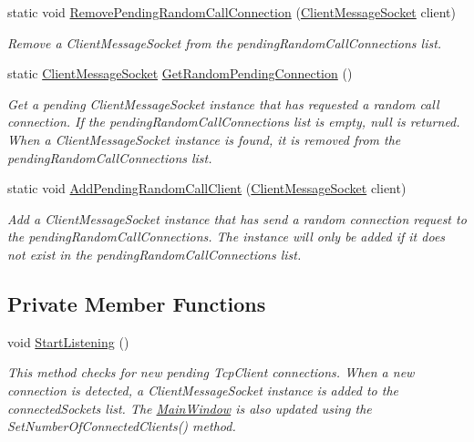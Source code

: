 \begin{DoxyCompactItemize}
static void \hyperlink{class_e_l_i_server_1_1_message_socket_manager_aa4716112d551ce249f56cca53764d19d}{Remove\+Pending\+Random\+Call\+Connection} (\hyperlink{class_e_l_i_server_1_1_messaging_1_1_client_message_socket}{Client\+Message\+Socket} client)
\begin{DoxyCompactList}\small\item\em Remove a Client\+Message\+Socket from the pending\+Random\+Call\+Connections list. \end{DoxyCompactList}\item 
static \hyperlink{class_e_l_i_server_1_1_messaging_1_1_client_message_socket}{Client\+Message\+Socket} \hyperlink{class_e_l_i_server_1_1_message_socket_manager_a6988d1ee0c08ded66a3d428f04585716}{Get\+Random\+Pending\+Connection} ()
\begin{DoxyCompactList}\small\item\em Get a pending Client\+Message\+Socket instance that has requested a random call connection. If the pending\+Random\+Call\+Connections list is empty, null is returned. When a Client\+Message\+Socket instance is found, it is removed from the pending\+Random\+Call\+Connections list. \end{DoxyCompactList}\item 
static void \hyperlink{class_e_l_i_server_1_1_message_socket_manager_ac2dffa438503f596446e4a0137582962}{Add\+Pending\+Random\+Call\+Client} (\hyperlink{class_e_l_i_server_1_1_messaging_1_1_client_message_socket}{Client\+Message\+Socket} client)
\begin{DoxyCompactList}\small\item\em Add a Client\+Message\+Socket instance that has send a random connection request to the pending\+Random\+Call\+Connections. The instance will only be added if it does not exist in the pending\+Random\+Call\+Connections list. \end{DoxyCompactList}\end{DoxyCompactItemize}
\subsection*{Private Member Functions}
\begin{DoxyCompactItemize}
\item 
void \hyperlink{class_e_l_i_server_1_1_message_socket_manager_ab5d2f61a349046960ae63303ff1c2130}{Start\+Listening} ()
\begin{DoxyCompactList}\small\item\em This method checks for new pending Tcp\+Client connections. When a new connection is detected, a Client\+Message\+Socket instance is added to the connected\+Sockets list. The \hyperlink{class_e_l_i_server_1_1_main_window}{Main\+Window} is also updated using the Set\+Number\+Of\+Connected\+Clients() method. \end{DoxyCompactList}\end{DoxyCompactItemize}
